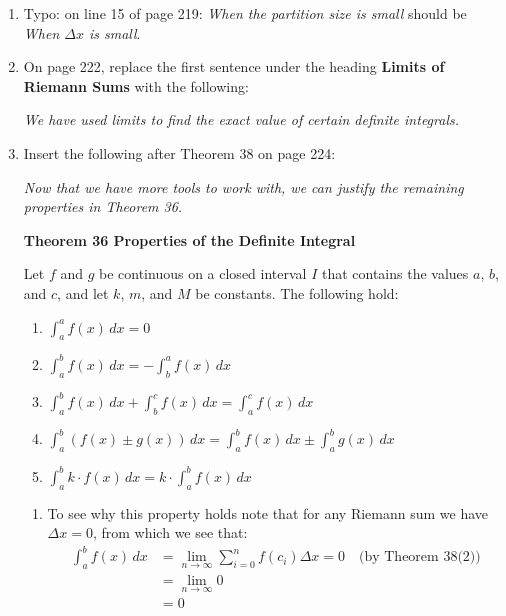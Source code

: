 \documentclass[11pt]{report}
\newcommand{\typo}[4]{\item Typo: on line #2 of page #1: \emph{#3} should be \emph{#4}.}
\begin{document}
\begin{enumerate}
\begin{enumerate}
{Using many, many rectangles, we likely have a good approximation of $\int_0^4 (4x-x^2)\,dx$. That is, \[\int_0^4 (4x-x^2)\,dx\approx 10.666656.\]
}

{\bfseries \color{red} Note that we also have to change Figure 5.18 for this to work.}

\end{enumerate}

\typo{219}{15}{When the partition size is small}{When $\Delta x$ is small}

\item On page 222, replace the first sentence under the heading {\bfseries Limits of Riemann Sums} with the following:

{\slshape We have used limits to find the exact value of certain definite integrals.}

\item Insert the following after Theorem 38 on page 224:

{\slshape Now that we have more tools to work with, we can justify the remaining properties in Theorem 36. 

{\bfseries Theorem 36 \quad Properties of the Definite Integral}

Let $f$ and $g$ be continuous on a closed interval $I$ that contains the values $a$, $b$, and $c$, and let $k$, $m$, and $M$ be constants. The following hold:
\begin{enumerate}
\item $\displaystyle\int_a^a f(x)\,dx=0$
\item $\displaystyle\int_a^b f(x)\,dx=-\int_b^a f(x)\,dx$
\item $\displaystyle\int_a^b f(x)\,dx+\int_b^c f(x)\,dx=\int_a^c f(x)\,dx$
\item $\displaystyle\int_a^b (f(x)\pm g(x))\,dx =\int_a^b f(x)\,dx \pm \int_a^b g(x)\,dx$
\item $\displaystyle\int_a^b k\cdot f(x)\,dx =k\cdot \int_a^b f(x)\,dx$
\end{enumerate}

\begin{enumerate}
\item To see why this property holds note that for any Riemann sum we have $\Delta x=0$, from which we see that: 
\begin{equation*}
\begin{split}
\int_a^b f(x)\,dx&=\lim_{n\to\infty}\sum_{i=0}^n f(c_i)\Delta x=0 \quad \text{(by Theorem 38(2))}\\
&=\lim_{n\to\infty} 0\\
&=0\\
\end{split}
\end{equation*}


\end{enumerate}}
\end{enumerate}
\end{document}
